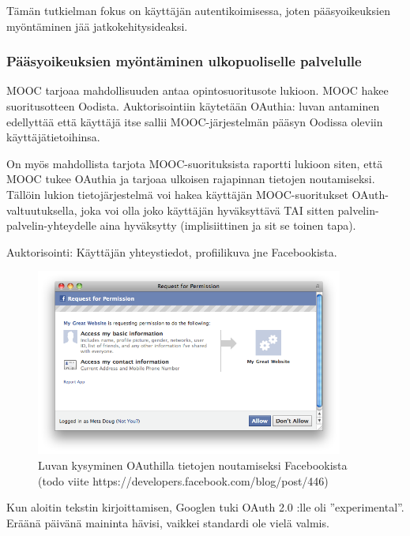 \documentclass[finnish,gradu]{tktltiki}
\begin{document}
  Tämän tutkielman fokus on käyttäjän autentikoimisessa, joten pääsyoikeuksien myöntäminen jää jatkokehitysideaksi.



  \subsubsection{Pääsyoikeuksien myöntäminen ulkopuoliselle palvelulle} %
  \label{ssub:jatkokehitysideoita_auktorisointi}
  MOOC tarjoaa mahdollisuuden antaa opintosuoritusote lukioon. MOOC hakee suoritusotteen Oodista. Auktorisointiin käytetään OAuthia: luvan antaminen edellyttää että käyttäjä itse sallii MOOC-järjestelmän pääsyn Oodissa oleviin käyttäjätietoihinsa.

  On myös mahdollista tarjota MOOC-suorituksista raportti lukioon siten, että MOOC tukee OAuthia ja tarjoaa ulkoisen rajapinnan tietojen noutamiseksi. Tällöin lukion tietojärjestelmä voi hakea käyttäjän MOOC-suoritukset OAuth-valtuutuksella, joka voi olla joko käyttäjän hyväksyttävä TAI sitten palvelin-palvelin-yhteydelle aina hyväksytty (implisiittinen ja sit se toinen tapa).

  Auktorisointi: Käyttäjän yhteystiedot, profiilikuva jne Facebookista.

  \begin{figure}
    \centering
    \includegraphics[width=0.9\textwidth]{images/facebook_authorization_contact_info.png}
    \caption{Luvan kysyminen OAuthilla tietojen noutamiseksi Facebookista (todo viite https://developers.facebook.com/blog/post/446)}
    \label{fig:luvan_kysyminen_oauth_fb}
  \end{figure}

  Kun aloitin tekstin kirjoittamisen, Googlen tuki OAuth 2.0 :lle oli ''experimental''. Eräänä päivänä maininta hävisi, vaikkei standardi ole vielä valmis. %
\end{document}
